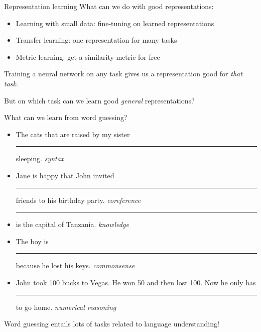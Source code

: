 \documentclass[usenames,dvipsnames,notes,11pt,aspectratio=169,hyperref={colorlinks=true, linkcolor=blue}]{beamer}
\begin{document}
\begin{frame}
    {Representation learning}
    What can we do with good representations:\\
    \begin{itemize}
        \item Learning with small data: fine-tuning on learned representations
        \item Transfer learning: one representation for many tasks 
        \item Metric learning: get a similarity metric for free 
    \end{itemize}

    \pause
    Training a neural network on any task gives us a representation good for \textit{that task}.

    But on which task can we learn good \textit{general} representations?
\end{frame}

\begin{frame}
    {What can we learn from word guessing?}
    \begin{itemize}
        \itemsep1em
        \item The cats that are raised by my sister \rule{1.5cm}{0.5mm} sleeping. \pause\hfill \textit{syntax}
        \item Jane is happy that John invited \rule{1.5cm}{0.5mm} friends to his birthday party. \pause\hfill \textit{coreference}
        \item \rule{1.5cm}{0.5mm} is the capital of Tanzania. \pause\hfill \textit{knowledge}
        \item The boy is \rule{1.5cm}{0.5mm} because he lost his keys.  \pause\hfill \textit{commonsense}
        \item John took 100 bucks to Vegas. He won 50 and then lost 100. Now he only has \rule{1.5cm}{0.5mm} to go home. \pause\hfill \textit{numerical reasoning}
    \end{itemize}

    \pause\bigskip
    Word guessing entails lots of tasks related to language understanding!
\end{frame}
\end{document}

